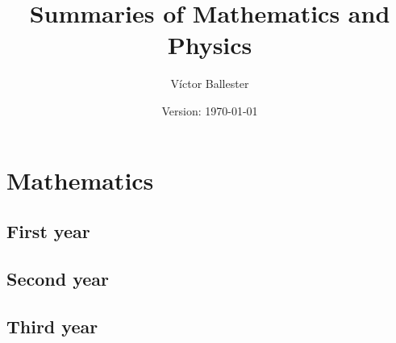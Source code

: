 \documentclass[10pt,a4paper]{report}
\title{Summaries of Mathematics and Physics}
\author{Víctor Ballester}
\date{Version: \today}
\begin{document}
\maketitle
\newpage
\tableofcontents
\newpage
\part{Mathematics}
\chapter{First year}
\newpage

\cleardoublepage


\cleardoublepage


\cleardoublepage


\chapter{Second year}
\newpage

\cleardoublepage


\cleardoublepage


\cleardoublepage


\cleardoublepage


\cleardoublepage


\cleardoublepage


\chapter{Third year}
\newpage

\cleardoublepage


\cleardoublepage


\cleardoublepage


\cleardoublepage
\end{document}
